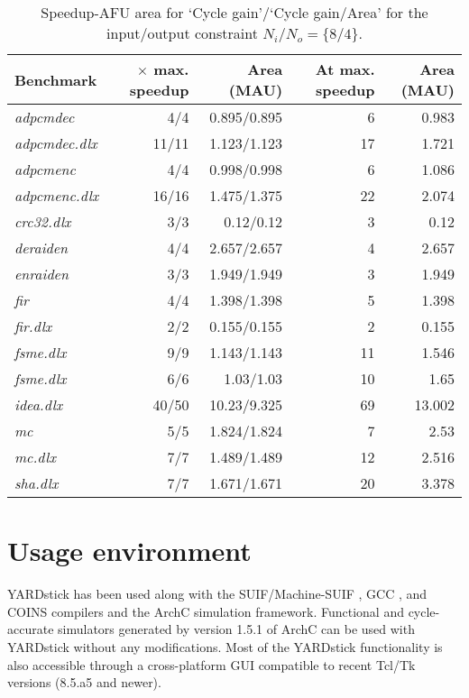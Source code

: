 \documentclass{comjnl}
\begin{document}
\begin{table}
  \renewcommand{\arraystretch}{1.0}
  \caption{Speedup-AFU area for `Cycle gain'/`Cycle gain/Area' 
  for the input/output constraint $N_{i}/N_{o}=\{8/4\}$.} 
  \centering
  {\footnotesize
  \begin{tabular}{|l|r|r|r|r|}
    \hline
    \multicolumn{1}{|m{1.2cm}|}{\centering Benchmark}
    &\multicolumn{1}{m{1.0cm}|}{\centering 0.95$\times$ max. speedup}
    &\multicolumn{1}{m{1.2cm}|}{\centering Area (MAU)}
    &\multicolumn{1}{m{1.0cm}|}{\centering At max. speedup}
    &\multicolumn{1}{m{1.2cm}|}{\centering Area (MAU)}\\
    \hline
{\it adpcmdec} & 4/4 & 0.895/0.895 & 6 & 0.983 \\ 
    \hline
{\it adpcmdec.dlx} & 11/11 & 1.123/1.123 & 17 & 1.721 \\ 
    \hline
{\it adpcmenc} & 4/4 & 0.998/0.998 & 6 & 1.086 \\
    \hline
{\it adpcmenc.dlx} & 16/16 & 1.475/1.375 & 22 & 2.074 \\
    \hline
{\it crc32.dlx} & 3/3 & 0.12/0.12 & 3 & 0.12 \\
    \hline
{\it deraiden} & 4/4 & 2.657/2.657 & 4 & 2.657 \\
    \hline
{\it enraiden} & 3/3 & 1.949/1.949 & 3 & 1.949 \\
    \hline
{\it fir} & 4/4 & 1.398/1.398 & 5 & 1.398 \\
    \hline
{\it fir.dlx} & 2/2 & 0.155/0.155 & 2 & 0.155 \\
    \hline
{\it fsme.dlx} & 9/9 & 1.143/1.143 & 11 & 1.546 \\
    \hline
{\it fsme.dlx} & 6/6 & 1.03/1.03 & 10 & 1.65 \\
    \hline
{\it idea.dlx} & 40/50 & 10.23/9.325 & 69 & 13.002 \\
    \hline
{\it mc} & 5/5 & 1.824/1.824 & 7 & 2.53 \\
    \hline
{\it mc.dlx} & 7/7 & 1.489/1.489 & 12 & 2.516 \\
    \hline
{\it sha.dlx} & 7/7 & 1.671/1.671 & 20 & 3.378 \\
    \hline
  \end{tabular}
  }
  \label{Tab:5}
  \vspace{-0.25cm}
\end{table}

\section{Usage environment}
\label{Sec:Usage}
YARDstick has been used along with the SUIF/Machine-SUIF \cite{MachSUIF}, GCC \cite{GCC}, and COINS \cite{COINS} compilers and the ArchC \cite{ArchC} simulation framework. Functional and cycle-accurate simulators generated by version 1.5.1 of ArchC can be used with YARDstick without any modifications. Most of the YARDstick functionality is also accessible through a cross-platform GUI \cite{Kavvadias07} compatible to recent Tcl/Tk versions (8.5.a5 and newer). 
\end{document}
